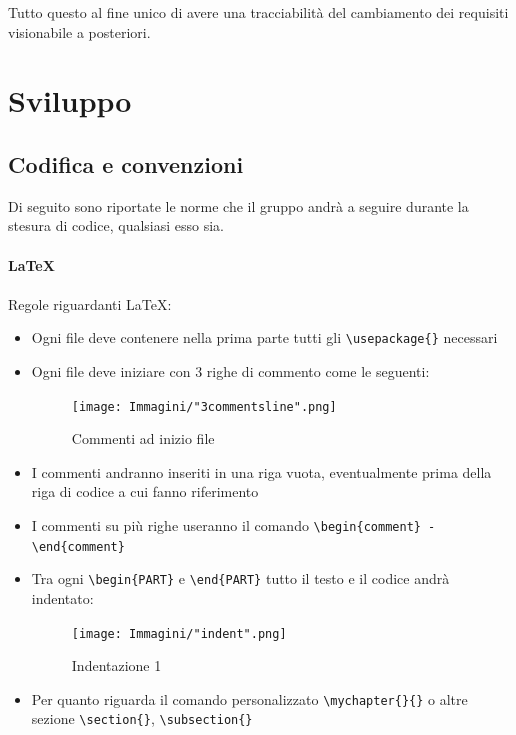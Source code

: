 \documentclass[a4paper]{report}
\newcommand{\mychapter}[2]{
	\setcounter{chapter}{#1}
	\setcounter{section}{0}
	\setcounter{subsection}{1}
	\chapter*{#2}
	\addcontentsline{toc}{chapter}{#2}
}
\begin{document}
	Tutto questo al fine unico di avere una tracciabilità del cambiamento dei requisiti visionabile a posteriori.
	\section{Sviluppo}
	\subsection{Codifica e convenzioni}
	Di seguito sono riportate le norme che il gruppo andrà a seguire durante la stesura di codice, qualsiasi esso sia.
	\\ \\
	\textbf{\LaTeX} \\ \\ 
	Regole riguardanti \LaTeX :
	\begin{itemize}
		\item Ogni file deve contenere nella prima parte tutti gli \verb|\usepackage{}| necessari
		\item Ogni file deve iniziare con 3 righe di commento come le seguenti:
		\begin{figure}[h!]
			\centering
			\texttt{[image: Immagini/"3commentsline".png]}
			\caption{Commenti ad inizio file}
		\end{figure}
		\item I commenti andranno inseriti in una riga vuota, eventualmente prima della riga di codice a cui fanno riferimento
		\item I commenti su più righe useranno il comando \verb|\begin{comment} - \end{comment}|
		\item Tra ogni \verb|\begin{PART}| e \verb|\end{PART}| tutto il testo e il codice andrà indentato:
		\begin{figure}[h!]
			\centering
			\texttt{[image: Immagini/"indent".png]}
			\caption{Indentazione 1}
		\end{figure}
		\item Per quanto riguarda il comando personalizzato \verb|\mychapter{}{}| o altre sezione \verb|\section{}|, \verb|\subsection{}| 

\end{itemize}
\end{document}

